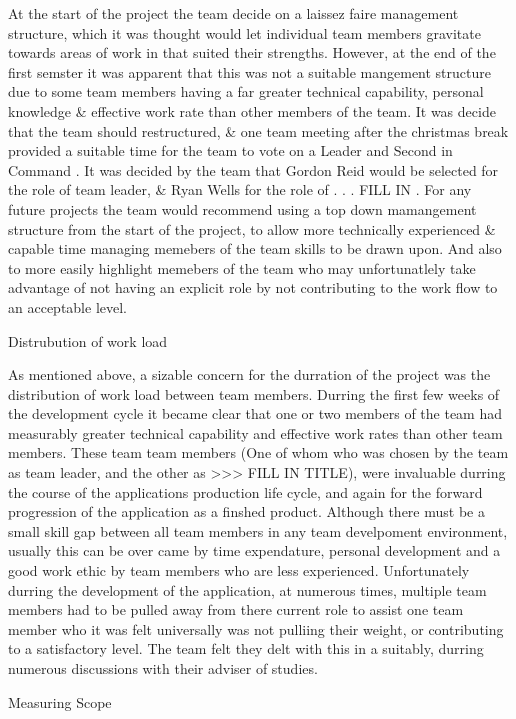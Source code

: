 At the start of the project the team decide on a laissez faire management structure, which it was thought would let individual team members gravitate towards areas of work in that suited their strengths. However, at the end of the first semster it was apparent that this was not a suitable mangement structure due to some team members having a far greater technical capability, personal knowledge \& effective work rate than other members of the team. It was decide that the team should restructured, \& one team meeting after the christmas break provided a suitable time for the team to vote on a Leader and Second in Command . It was decided by the team that Gordon Reid would be selected for the role of team leader, \& Ryan Wells for the role of . . . FILL IN  . For any future projects the team would recommend using a top down mamangement structure from the start of the project, to allow more technically experienced \& capable time managing memebers of the team skills to be drawn upon. And also to more easily highlight memebers of the team who may unfortunatlely take advantage of not having an explicit role by not contributing to the work flow to an acceptable level.           

Distrubution of work load

As mentioned above, a sizable concern for the durration of the project was the distribution of work load between team members. Durring the first few weeks of the development cycle it became clear that one or two members of the team had measurably greater technical capability and effective work rates than other team members. These team team members (One of whom who was chosen by the team as team leader, and the other as >>> FILL IN TITLE), were invaluable durring the course of the applications production life cycle, and again for the forward progression of the application as a finshed product. Although there must be a small skill gap between all team members in any team develpoment environment, usually this can be over came by time expendature, personal development and a good work ethic by team members who are less experienced. Unfortunately durring the development of the application, at numerous times, multiple team members had to be pulled away from there current role to assist one team member who it was felt universally was not pulliing their weight, or contributing to a satisfactory level. The team felt they delt with this in a suitably, durring numerous discussions with their adviser of studies.           

Measuring Scope 

